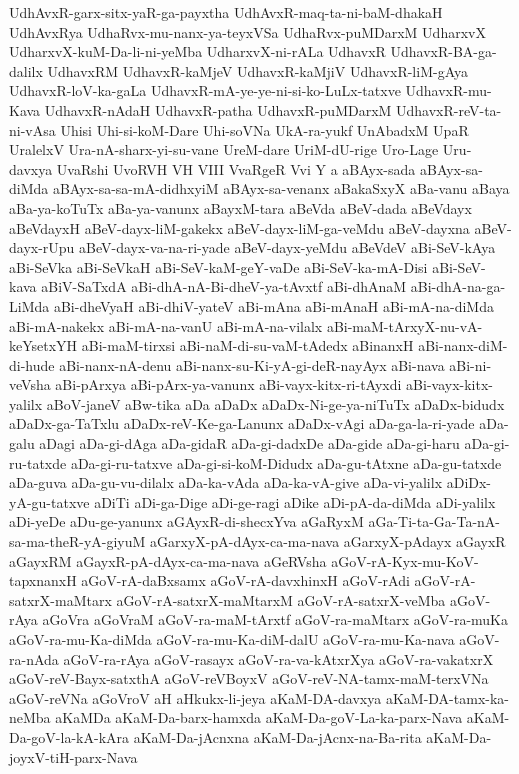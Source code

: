 {UdhAvxR-garx-sitx-yaR-ga-payxtha
UdhAvxR-maq-ta-ni-baM-dhakaH
UdhAvxRya
UdhaRvx-mu-nanx-ya-teyxVSa
UdhaRvx-puMDarxM
UdharxvX
UdharxvX-kuM-Da-li-ni-yeMba
UdharxvX-ni-rALa
UdhavxR
UdhavxR-BA-ga-dalilx
UdhavxRM
UdhavxR-kaMjeV
UdhavxR-kaMjiV
UdhavxR-liM-gAya
UdhavxR-loV-ka-gaLa
UdhavxR-mA-ye-ye-ni-si-ko-LuLx-tatxve
UdhavxR-mu-Kava
UdhavxR-nAdaH
UdhavxR-patha
UdhavxR-puMDarxM
UdhavxR-reV-ta-ni-vAsa
Uhisi
Uhi-si-koM-Dare
Uhi-soVNa
UkA-ra-yukf
UnAbadxM
UpaR
UralelxV
Ura-nA-sharx-yi-su-vane
UreM-dare
UriM-dU-rige
Uro-Lage
Uru-davxya
UvaRshi
UvoRVH
VH
VIII
VvaRgeR
Vvi
Y
a
aBAyx-sada
aBAyx-sa-diMda
aBAyx-sa-sa-mA-didhxyiM
aBAyx-sa-venanx
aBakaSxyX
aBa-vanu
aBaya
aBa-ya-koTuTx
aBa-ya-vanunx
aBayxM-tara
aBeVda
aBeV-dada
aBeVdayx
aBeVdayxH
aBeV-dayx-liM-gakekx
aBeV-dayx-liM-ga-veMdu
aBeV-dayxna
aBeV-dayx-rUpu
aBeV-dayx-va-na-ri-yade
aBeV-dayx-yeMdu
aBeVdeV
aBi-SeV-kAya
aBi-SeVka
aBi-SeVkaH
aBi-SeV-kaM-geY-vaDe
aBi-SeV-ka-mA-Disi
aBi-SeV-kava
aBiV-SaTxdA
aBi-dhA-nA-Bi-dheV-ya-tAvxtf
aBi-dhAnaM
aBi-dhA-na-ga-LiMda
aBi-dheVyaH
aBi-dhiV-yateV
aBi-mAna
aBi-mAnaH
aBi-mA-na-diMda
aBi-mA-nakekx
aBi-mA-na-vanU
aBi-mA-na-vilalx
aBi-maM-tArxyX-nu-vA-keYsetxYH
aBi-maM-tirxsi
aBi-naM-di-su-vaM-tAdedx
aBinanxH
aBi-nanx-diM-di-hude
aBi-nanx-nA-denu
aBi-nanx-su-Ki-yA-gi-deR-nayAyx
aBi-nava
aBi-ni-veVsha
aBi-pArxya
aBi-pArx-ya-vanunx
aBi-vayx-kitx-ri-tAyxdi
aBi-vayx-kitx-yalilx
aBoV-janeV
aBw-tika
aDa
aDaDx
aDaDx-Ni-ge-ya-niTuTx
aDaDx-bidudx
aDaDx-ga-TaTxlu
aDaDx-reV-Ke-ga-Lanunx
aDaDx-vAgi
aDa-ga-la-ri-yade
aDa-galu
aDagi
aDa-gi-dAga
aDa-gidaR
aDa-gi-dadxDe
aDa-gide
aDa-gi-haru
aDa-gi-ru-tatxde
aDa-gi-ru-tatxve
aDa-gi-si-koM-Didudx
aDa-gu-tAtxne
aDa-gu-tatxde
aDa-guva
aDa-gu-vu-dilalx
aDa-ka-vAda
aDa-ka-vA-give
aDa-vi-yalilx
aDiDx-yA-gu-tatxve
aDiTi
aDi-ga-Dige
aDi-ge-ragi
aDike
aDi-pA-da-diMda
aDi-yalilx
aDi-yeDe
aDu-ge-yanunx
aGAyxR-di-shecxYva
aGaRyxM
aGa-Ti-ta-Ga-Ta-nA-sa-ma-theR-yA-giyuM
aGarxyX-pA-dAyx-ca-ma-nava
aGarxyX-pAdayx
aGayxR
aGayxRM
aGayxR-pA-dAyx-ca-ma-nava
aGeRVsha
aGoV-rA-Kyx-mu-KoV-tapxnanxH
aGoV-rA-daBxsamx
aGoV-rA-davxhinxH
aGoV-rAdi
aGoV-rA-satxrX-maMtarx
aGoV-rA-satxrX-maMtarxM
aGoV-rA-satxrX-veMba
aGoV-rAya
aGoVra
aGoVraM
aGoV-ra-maM-tArxtf
aGoV-ra-maMtarx
aGoV-ra-muKa
aGoV-ra-mu-Ka-diMda
aGoV-ra-mu-Ka-diM-dalU
aGoV-ra-mu-Ka-nava
aGoV-ra-nAda
aGoV-ra-rAya
aGoV-rasayx
aGoV-ra-va-kAtxrXya
aGoV-ra-vakatxrX
aGoV-reV-Bayx-satxthA
aGoV-reVBoyxV
aGoV-reV-NA-tamx-maM-terxVNa
aGoV-reVNa
aGoVroV
aH
aHkukx-li-jeya
aKaM-DA-davxya
aKaM-DA-tamx-ka-neMba
aKaMDa
aKaM-Da-barx-hamxda
aKaM-Da-goV-La-ka-parx-Nava
aKaM-Da-goV-la-kA-kAra
aKaM-Da-jAcnxna
aKaM-Da-jAcnx-na-Ba-rita
aKaM-Da-joyxV-tiH-parx-Nava
}

